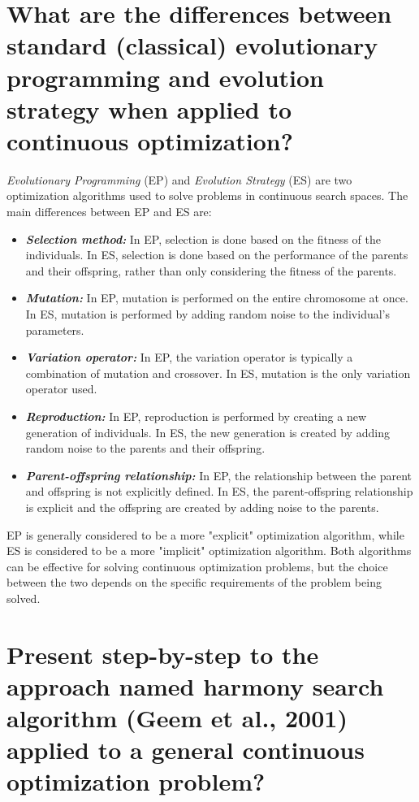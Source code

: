 \documentclass[conference]{IEEEtran}
\begin{document}
\section{What are the differences between standard (classical) evolutionary programming and evolution strategy when applied to continuous optimization?}

\textit{Evolutionary Programming }(EP) and \textit{Evolution Strategy} (ES) are two optimization algorithms used to solve problems in continuous search spaces. The main differences between EP and ES are:

\begin{itemize}
	\item \textbf{\textit{Selection method:}} In EP, selection is done based on the fitness of the individuals. In ES, selection is done based on the performance of the parents and their offspring, rather than only considering the fitness of the parents.
	
	\item \textbf{\textit{Mutation:}} In EP, mutation is performed on the entire chromosome at once. In ES, mutation is performed by adding random noise to the individual's parameters.
	
	\item \textbf{\textit{Variation operator:}} In EP, the variation operator is typically a combination of mutation and crossover. In ES, mutation is the only variation operator used.
	
	\item \textbf{\textit{Reproduction:}} In EP, reproduction is performed by creating a new generation of individuals. In ES, the new generation is created by adding random noise to the parents and their offspring.
	
	\item \textbf{\textit{Parent-offspring relationship:}} In EP, the relationship between the parent and offspring is not explicitly defined. In ES, the parent-offspring relationship is explicit and the offspring are created by adding noise to the parents.
\end{itemize}

EP is generally considered to be a more "explicit" optimization algorithm, while ES is considered to be a more "implicit" optimization algorithm. Both algorithms can be effective for solving continuous optimization problems, but the choice between the two depends on the specific requirements of the problem being solved.

\section{Present step-by-step to the approach named harmony search algorithm (Geem et al., 2001) applied to a general continuous optimization problem?}
\end{document}
